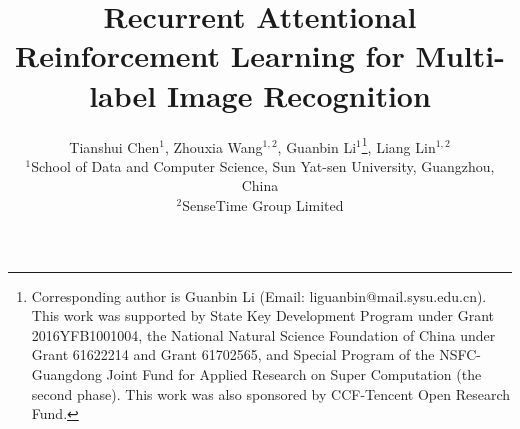 \documentclass[letterpaper]{article} %
\begin{document}
%
\title{Recurrent Attentional Reinforcement Learning for Multi-label Image Recognition}
\author{Tianshui Chen$^1$, Zhouxia Wang$^{1,2}$, Guanbin Li$^{1}$\thanks{Corresponding author is Guanbin Li (Email: liguanbin@mail.sysu.edu.cn). This work was supported by State Key Development Program under Grant 2016YFB1001004, the National Natural
Science Foundation of China under Grant 61622214 and Grant 61702565, and Special Program of the NSFC-Guangdong Joint Fund for Applied Research on Super Computation (the second phase). This work was also sponsored by CCF-Tencent Open Research Fund.}, Liang Lin$^{1,2}$\\
$^1$School of Data and Computer Science, Sun Yat-sen University, Guangzhou, China\\
$^2$SenseTime Group Limited\\
}
\maketitle
\end{document}
